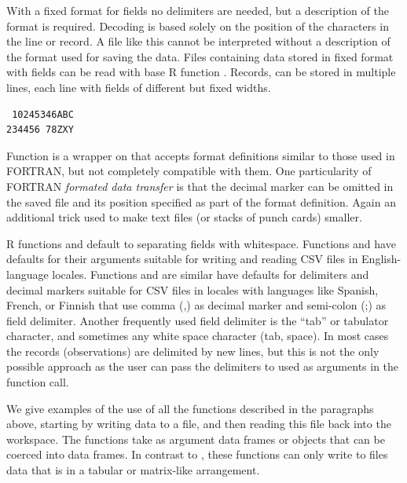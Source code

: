\documentclass[krantz2,ChapterTOCs]{krantz}\usepackage{knitr}
\begin{document}
With a fixed format for fields no delimiters are needed, but a description of the format is required. Decoding is based solely on the position of the characters in the line or record. A file like this cannot be interpreted without a description of the format used for saving the data. Files containing data stored in fixed format with fields can be read with base R function . Records, can be stored in multiple lines, each line with fields of different but fixed widths.
\begin{verbatim}
 10245346ABC
234456 78ZXY
\end{verbatim}

Function  is a wrapper on  that accepts format definitions similar to those used in FORTRAN, but not completely compatible with them. One particularity of FORTRAN \emph{formated data transfer} is that the decimal marker can be omitted in the saved file and its position specified as part of the format definition. Again an additional trick used to make text files (or stacks of punch cards) smaller.

R functions  and  default to separating fields with whitespace. Functions  and  have defaults for their arguments suitable for writing and reading CSV files in English-language locales. Functions  and  are similar have defaults for delimiters and decimal markers suitable for CSV files in locales with languages like Spanish, French, or Finnish that use comma (,) as decimal marker and semi-colon (;) as field delimiter. Another frequently used field delimiter is the ``tab'' or tabulator character, and sometimes any white space character (tab, space). In most cases the records (observations) are delimited by new lines, but this is not the only possible approach as the user can pass the delimiters to used as arguments in the function call.

We give examples of the use of all the functions described in the paragraphs above, starting by writing data to a file, and then reading this file back into the workspace. The  functions take as argument data frames or objects that can be coerced into data frames. In contrast to , these functions can only write to files data that is in a tabular or matrix-like arrangement.

\begin{knitrout}\footnotesize
{}\color{fgcolor}\begin{kframe}
\begin{alltt}
 \hlkwb{<-} \hlstd{(} \hlstd{=} \hlopt{:}\hlstd{,}  \hlstd{=} \hlopt{:} \hlopt{/} \hlstd{)}
\end{alltt}
\end{kframe}
\end{knitrout}
\end{document}
